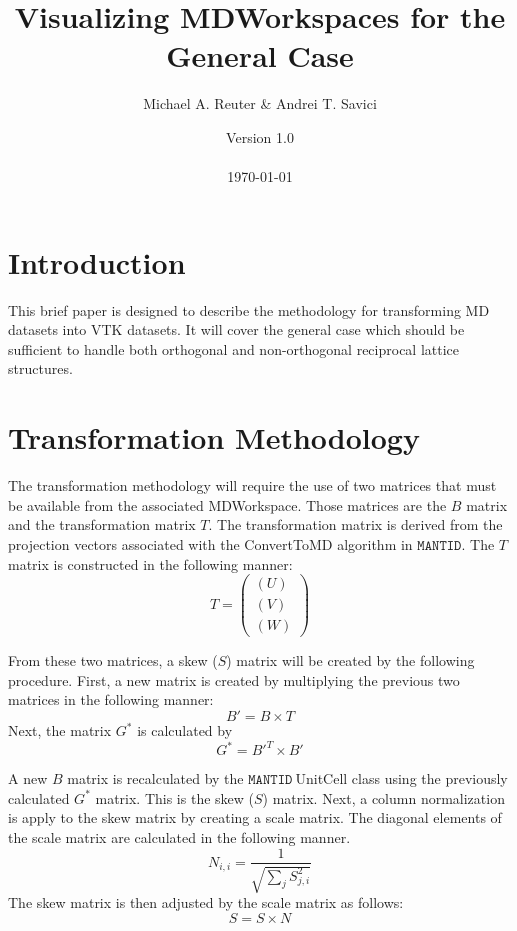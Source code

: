 \documentclass[11pt]{article}
\numberwithin{equation}{section}
\numberwithin{figure}{section}
\newcommand{\mantid}{\ensuremath{\mathtt{MANTID}}}
\begin{document}
\title{Visualizing MDWorkspaces for the General Case}
\author{Michael A. Reuter \& Andrei T. Savici}
\date{Version 1.0 \\ \ \\ \today}
\maketitle

\section{Introduction}

This brief paper is designed to describe the methodology for transforming MD datasets into VTK datasets. It will cover the general case which should be sufficient to handle both orthogonal and non-orthogonal reciprocal lattice structures.

\section{Transformation Methodology}

The transformation methodology will require the use of two matrices that must be available from the associated MDWorkspace. Those matrices are the $B$ matrix and the transformation matrix $T$. The transformation matrix is derived from the projection vectors associated with the ConvertToMD algorithm in \mantid. The $T$ matrix is constructed in the following manner:
\begin{equation}
T = \left(\begin{array}{c}(U)\\(V)\\(W)\end{array}\right)
\end{equation}

From these two matrices, a skew ($S$) matrix will be created by the following procedure. First, a new matrix is created by multiplying the previous two matrices in the following manner:
\begin{equation}
B' = B \times T
\end{equation}
Next, the matrix $G^*$ is calculated by
\begin{equation}
G^* = B'^{T} \times B'
\end{equation}

A new $B$ matrix is recalculated by the \mantid$\ $UnitCell class using the previously calculated $G^*$ matrix. This is the skew ($S$) matrix. Next, a column normalization is apply to the skew matrix by creating a scale matrix. The diagonal elements of the scale matrix are calculated in the following manner.
\begin{equation}
N_{i,i} = \frac{1}{\sqrt{\sum_j S_{j,i}^2}}
\end{equation}
The skew matrix is then adjusted by the scale matrix as follows:
\begin{equation}
S = S \times N
\end{equation}
\end{document}

